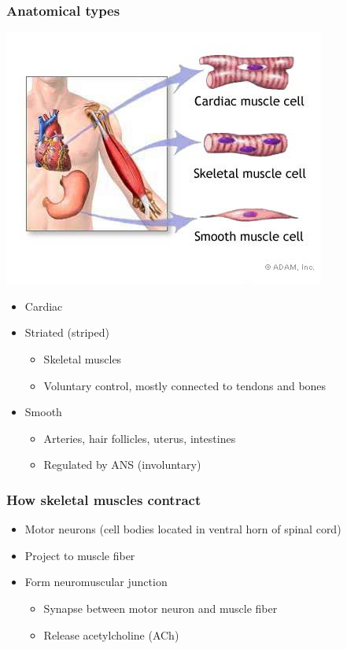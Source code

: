 \documentclass[
  letterpaper,
  DIV=11,
  numbers=noendperiod]{scrartcl}
\providecommand{\tightlist}{%
  \setlength{\itemsep}{0pt}\setlength{\parskip}{0pt}}\usepackage{longtable,booktabs,array}
\begin{document}
\subsubsection{Anatomical types}\label{anatomical-types}

\begin{center}
\includegraphics{action_files/mediabag/19917.jpg}
\end{center}

\begin{itemize}
\tightlist
\item
  Cardiac
\item
  Striated (striped)

  \begin{itemize}
  \tightlist
  \item
    Skeletal muscles
  \item
    Voluntary control, mostly connected to tendons and bones
  \end{itemize}
\item
  Smooth

  \begin{itemize}
  \tightlist
  \item
    Arteries, hair follicles, uterus, intestines
  \item
    Regulated by ANS (involuntary)
  \end{itemize}
\end{itemize}

\subsubsection{How skeletal muscles
contract}\label{how-skeletal-muscles-contract}

\begin{itemize}
\tightlist
\item
  Motor neurons (cell bodies located in ventral horn of spinal cord)
\item
  Project to muscle fiber
\item
  Form neuromuscular junction

  \begin{itemize}
  \tightlist
  \item
    Synapse between motor neuron and muscle fiber
  \item
    Release acetylcholine (ACh)
  \end{itemize}
\end{itemize}
\end{document}
